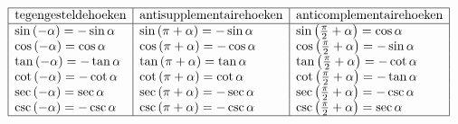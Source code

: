 \documentclass[a5paper]{article}
\begin{document}
\[
\begin{array}{|l|l|l|}
\hline
\text{tegengesteldehoeken} & \text{antisupplementairehoeken} & \text{anticomplementairehoeken} \\
\hline
\sin{\left(-\alpha\right)} = -\sin{\alpha} & \sin{\left(\pi + \alpha\right)} = -\sin{\alpha} & \sin{\left(\frac{\pi}{2} + \alpha\right)} = \cos{\alpha} \\
\cos{\left(-\alpha\right)} = \cos{\alpha} & \cos{\left(\pi + \alpha\right)} = -\cos{\alpha} & \cos{\left(\frac{\pi}{2} + \alpha\right)} = -\sin{\alpha} \\
\tan{\left(-\alpha\right)} = -\tan{\alpha} & \tan{\left(\pi + \alpha\right)} = \tan{\alpha} & \tan{\left(\frac{\pi}{2} + \alpha\right)} = -\cot{\alpha} \\
\cot{\left(-\alpha\right)} = -\cot{\alpha} & \cot{\left(\pi + \alpha\right)} = \cot{\alpha} & \cot{\left(\frac{\pi}{2} + \alpha\right)} = -\tan{\alpha} \\
\sec{\left(-\alpha\right)} = \sec{\alpha} & \sec{\left(\pi + \alpha\right)} = -\sec{\alpha} & \sec{\left(\frac{\pi}{2} + \alpha\right)} = -\csc{\alpha} \\
\csc{\left(-\alpha\right)} = -\csc{\alpha} & \csc{\left(\pi + \alpha\right)} = -\csc{\alpha} & \csc{\left(\frac{\pi}{2} + \alpha\right)} = \sec{\alpha} \\
\hline
\end{array}
\]

\newpage
\end{document}
